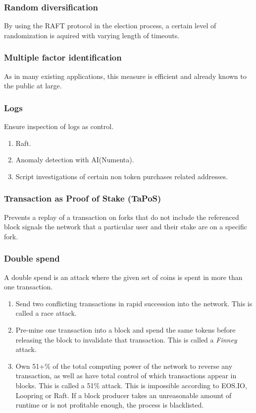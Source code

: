 \documentclass[]{article}
\begin{document}
		\subsubsection{Random diversification}
		By using the RAFT protocol in the election process, a certain level of randomization is aquired with varying length of timeouts.
		\subsubsection{Multiple factor identification}
		As in many existing applications, this measure is efficient and already known to the public at large.
		\subsubsection {Logs}
			Ensure inspection of logs as control.
			\begin{enumerate}
				\item Raft.
				\item Anomaly detection with AI(Numenta).
				\item Script investigations of certain non token purchases related addresses.
			\end{enumerate}
		\subsubsection{Transaction as Proof of Stake (TaPoS)}
			Prevents a replay of a transaction on forks that do not include the referenced block signals the network that a particular user and their stake are on a specific fork.
		\subsubsection{Double spend}
		A double spend is an attack where the given set of coins is spent in more than one transaction.
		\begin{enumerate}
			\item Send two conflicting transactions in rapid succession into the network. This is called a race attack. 
			\item Pre-mine one transaction into a block and spend the same tokens before releasing the block to invalidate that transaction. This is called a \textit{Finney} attack.
			\item Own 51+\% of the total computing power of the network to reverse any transaction, as well as have total control of which transactions appear in blocks. This is called a 51\% attack.
			This is impossible according to EOS.IO, Loopring or Raft.
			If a block producer takes an unreasonable amount of runtime or is not profitable enough, the process is blacklisted.\cite{7}
		\end{enumerate} 
\end{document}
